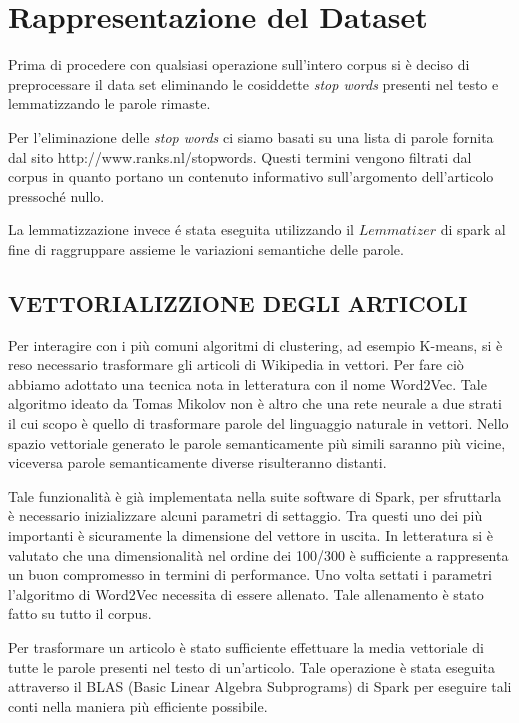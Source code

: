 \documentclass[
	12pt, %
	a4paper, %
	oneside, %
	headinclude,footinclude, %
	BCOR5mm, %
]{scrartcl}
\begin{document}
\section{Rappresentazione del Dataset}
	Prima di procedere con qualsiasi operazione sull'intero corpus si è deciso di preprocessare il data set eliminando le cosiddette \emph{stop words} presenti nel testo e lemmatizzando le parole rimaste.
	
	Per l'eliminazione delle \emph{stop words} ci siamo basati su una lista di parole fornita dal sito http://www.ranks.nl/stopwords. 
	Questi termini vengono filtrati dal corpus in quanto portano un contenuto informativo sull'argomento dell'articolo pressoch\'{e} nullo.
	
	La lemmatizzazione invece \'{e} stata eseguita utilizzando il $Lemmatizer$ di spark al fine di raggruppare assieme le variazioni semantiche delle parole.
	
	\subsection{VETTORIALIZZIONE DEGLI ARTICOLI}

        Per interagire con i più comuni algoritmi di clustering, ad esempio K-means, si è reso necessario trasformare
        gli articoli di Wikipedia in vettori.
        Per fare ciò abbiamo adottato una tecnica nota in letteratura con il nome Word2Vec. Tale algoritmo ideato da
        Tomas Mikolov non è altro che una rete neurale a due strati il cui scopo è quello di trasformare parole del
        linguaggio naturale in vettori. Nello spazio vettoriale generato le parole semanticamente più simili
        saranno più vicine, viceversa parole semanticamente diverse risulteranno distanti.

        Tale funzionalità è già implementata nella suite software di Spark,
        per sfruttarla è necessario inizializzare alcuni parametri di settaggio. Tra questi uno dei più importanti
        è sicuramente la dimensione del vettore in uscita. In letteratura si è valutato che una dimensionalità
        nel ordine dei 100/300 \cite{w2vdim}
        è sufficiente a rappresenta un buon compromesso in termini di performance.
        Uno volta settati i parametri l'algoritmo di Word2Vec necessita di essere allenato. Tale allenamento è stato
        fatto su tutto il corpus.

        Per trasformare un articolo è stato sufficiente effettuare la media vettoriale di tutte le parole presenti
        nel testo di un'articolo. Tale operazione è stata eseguita attraverso il BLAS (Basic Linear Algebra Subprograms)
        di Spark per eseguire tali conti nella maniera più efficiente possibile.
\end{document}
